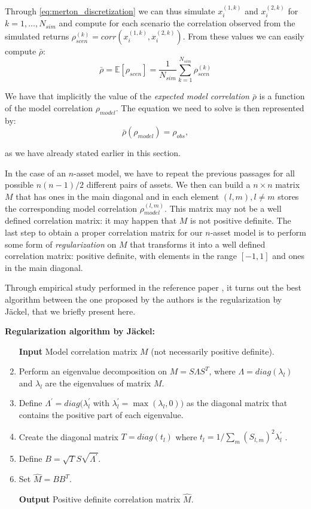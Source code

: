 Through \eqref{eq:merton_discretization} we can thus simulate $ x_i^{(1,k)}$ and 
$ x_i^{(2,k)}$ for $k= 1, ... ,N_{sim}$  and compute for each scenario the correlation observed from the simulated returns $\rho_{scen}^{(k)} = corr(x_i^{(1,k)}, x_i^{(2,k)})$.
From these values we can easily compute $\bar{\rho}$:
\begin{equation}
\label{eq:expected_model_correlation}
	\bar{\rho} = \mathbb{E} [\rho_{scen}] = \frac{1 }{N_{sim}} \sum_{k=1}^{N_{sim}} \rho_{scen}^{(k)}
\end{equation}


We have that implicitly the value of the \textit{expected model correlation} $\bar{\rho}$ is a function of the model correlation $\rho_{model}$. The equation we need to solve is then represented by:
\begin{equation}
\label{eq:expected_observed}
\bar{\rho}(\rho_{model}) = \rho_{obs},
\end{equation}

as we have already stated earlier in this section.

\bigskip
In the case of an $n$-asset model, we have to repeat the previous passages for all possible $n(n-1)/2 $ different pairs of assets. We then can build a $n \times n$ matrix $M$ that has ones in the main diagonal and in each element $(l,m), l \neq m$ stores the corresponding model correlation $\rho_{model}^{(l,m)}$.
This matrix may not be a well defined correlation matrix: it may happen that $M$ is not positive definite.
The last step to obtain a proper correlation matrix for our $n$-asset model is to perform some form of \textit{regularization} on $M$ that transforms it into a well defined correlation matrix: positive definite, with elements in the range $[-1,1]$ and ones in the main diagonal.

Through empirical study performed in the reference paper \citep{PARSIMONIOUS2011}, it turns out the best algorithm between the one proposed by the authors is the regularization by J\"ackel, that we briefly present here.

\bigskip
\textbf{Regularization algorithm by J\"ackel:}
\begin{enumerate}
	\item[\textbf{Input}] Model correlation matrix $M$ (not necessarily positive definite).
	\item Perform an eigenvalue decomposition on $M  = S \Lambda S^T$, where $\Lambda = diag(\lambda_l)$ and $\lambda_l$ are the eigenvalues of matrix $M$.
	\item Define $\Lambda^{'} = diag(\lambda_l^{'}$ with $\lambda_l^{'} = \max(\lambda_l, 0))$ as the diagonal matrix that contains the positive part of each eigenvalue.
	\item Create the diagonal matrix $T = diag(t_l)$ where $t_l =1 / \sum_{m} (S_{l,m})^2 \lambda_l^{'}$ .
	\item Define $B = \sqrt{T} S \sqrt{\Lambda^{'}}$.
	\item Set $\widehat{M} = B B^T$.
	\item[\textbf{Output}] Positive definite correlation matrix $\widehat{M}$.
\end{enumerate}

